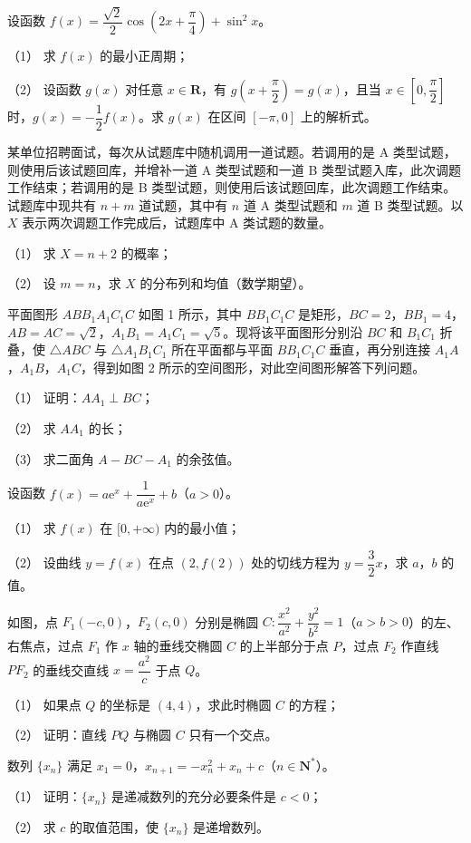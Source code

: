 \begin{question}
设函数 $f(x)=\dfrac{\sqrt2}2\cos\left(2x+\dfrac\pi4\right)+\sin^2x$。

（1） 求 $f(x)$ 的最小正周期；

（2） 设函数 $g(x)$ 对任意 $x\in\mathbf R$，有 $g\left(x+\dfrac\pi2\right)=g(x)$，且当 $x\in\left[0,\dfrac\pi2\right]$ 时，$g(x)=-\dfrac12f(x)$。求 $g(x)$ 在区间 $[-\pi,0]$ 上的解析式。

\end{question}
\begin{question}
某单位招聘面试，每次从试题库中随机调用一道试题。若调用的是 A 类型试题，则使用后该试题回库，并增补一道 A 类型试题和一道 B 类型试题入库，此次调题工作结束；若调用的是 B 类型试题，则使用后该试题回库，此次调题工作结束。试题库中现共有 $n+m$ 道试题，其中有 $n$ 道 A 类型试题和 $m$ 道 B 类型试题。以 $X$ 表示两次调题工作完成后，试题库中 A 类试题的数量。

（1） 求 $X=n+2$ 的概率；

（2） 设 $m=n$，求 $X$ 的分布列和均值（数学期望）。

\Needspace{0.4\textheight}
\end{question}
\begin{question}
平面图形 $ABB_1A_1C_1C$ 如图 1 所示，其中 $BB_1C_1C$ 是矩形，$BC=2$，$BB_1=4$，$AB=AC=\sqrt2$，$A_1B_1=A_1C_1=\sqrt5$。现将该平面图形分别沿 $BC$ 和 $B_1C_1$ 折叠，使 $\triangle ABC$ 与 $\triangle A_1B_1C_1$ 所在平面都与平面 $BB_1C_1C$ 垂直，再分别连接 $A_1A$，$A_1B$，$A_1C$，得到如图 2 所示的空间图形，对此空间图形解答下列问题。

（1） 证明：$AA_1\perp BC$；

（2） 求 $AA_1$ 的长；

（3） 求二面角 $A-BC-A_1$ 的余弦值。
\nopagebreak[4]
\begin{center}\end{center}
\nopagebreak[4]
\end{question}
\begin{question}
设函数 $f(x)=a\mathrm e^x+\dfrac1{a\mathrm e^x}+b$（$a>0$）。

（1） 求 $f(x)$ 在 $[0,+\infty)$ 内的最小值；

（2） 设曲线 $y=f(x)$ 在点 $(2,f(2))$ 处的切线方程为 $y=\dfrac32x$，求 $a$，$b$ 的值。

\Needspace{0.4\textheight}
\end{question}
\begin{question}
如图，点 $F_1(-c,0)$，$F_2(c,0)$ 分别是椭圆 $C:\dfrac{x^2}{a^2}+\dfrac{y^2}{b^2}=1$（$a>b>0$）的左、右焦点，过点 $F_1$ 作 $x$ 轴的垂线交椭圆 $C$ 的上半部分于点 $P$，过点 $F_2$ 作直线 $PF_2$ 的垂线交直线 $x=\dfrac{a^2}c$ 于点 $Q$。

（1） 如果点 $Q$ 的坐标是 $(4,4)$，求此时椭圆 $C$ 的方程；

（2） 证明：直线 $PQ$ 与椭圆 $C$ 只有一个交点。
\nopagebreak[4]
\begin{center}\end{center}
\nopagebreak[4]
\end{question}
\begin{question}
数列 $\{x_n\}$ 满足 $x_1=0$，$x_{n+1}=-x_n^2+x_n+c$（$n\in\mathbf N^*$）。

（1） 证明：$\{x_n\}$ 是递减数列的充分必要条件是 $c<0$；

（2） 求 $c$ 的取值范围，使 $\{x_n\}$ 是递增数列。

\end{question}
